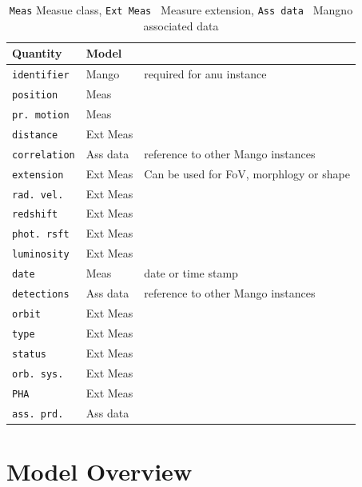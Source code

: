 \documentclass[11pt,a4paper]{ivoa}
\begin{document}
\begin{table}[ht!]
     \tiny
     \begin{tabular}{|p{2.4cm}|p{1.8cm}|p{7cm}|}
       \hline Quantity &  Model &  \\
       \hline  \texttt{identifier}      & Mango & required for anu instance\\                    
       \hline  \texttt{position}      &  Meas &  \\       
       \hline  \texttt{pr. motion}   & Meas &     \\       
       \hline  \texttt{distance}     & Ext Meas &     \\       
       \hline  \texttt{correlation}   & Ass data & reference to other Mango instances     \\       
       \hline  \texttt{extension}     & Ext Meas & Can be used for FoV, morphlogy or shape\\       
       \hline  \texttt{rad. vel.}       &  Ext Meas  &       \\       
       \hline  \texttt{redshift}        &   Ext Meas  &  \\             
       \hline  \texttt{phot. rsft}      & Ext Meas&    \\       
       \hline  \texttt{luminosity}    & Ext Meas&\\       
       \hline  \texttt{date}             & Meas & date or time stamp\\       
       \hline  \texttt{detections}    & Ass data & reference to other Mango instances   \\       
       \hline  \texttt{orbit}             & Ext Meas&      \\       
       \hline  \texttt{type}             &Ext Meas&     \\      
       \hline  \texttt{status}          &Ext Meas&     \\       
       \hline  \texttt{orb. sys.}      &Ext Meas&     \\       
       \hline  \texttt{PHA}            &Ext Meas&     \\       
       \hline  \texttt{ass. prd.}     &Ass data&  \\       
       \hline 
     \end{tabular}
     \caption{ \texttt{Meas} Measue class, \texttt{Ext Meas } Measure extension, \texttt{Ass data  } Mangno associated data} 
 \end{table}

\section{Model Overview}
\end{document}
